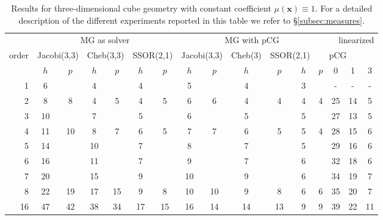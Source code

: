\documentclass[smallcondensed,final]{svjour3}     %
\newcommand{\bs}[1]{\ensuremath{\boldsymbol #1}}
\begin{document}
\begin{table}
  \caption{\label{tab:3d-box} Results for three-dimensional cube
    geometry with constant coefficient $\mu(\bs x) \equiv 1$. For a
    detailed description of the different experiments reported in this
    table we refer to \S\ref{subsec:measures}.}  \centering
	  \begin{tabular}{|r|c c|c c|c c||c c|c c|c c||c c c|} 
	    \hline
	    & \multicolumn{6}{c||}{MG as solver} & \multicolumn{6}{c||}{MG with pCG} & \multicolumn{3}{r|}{linearized} \\
	    \cline{2-13}
	    \!\!\! order \!\!\!\! &  \multicolumn{2}{c|}{\!\!\scriptsize  Jacobi(3,3)\!\!} &  \multicolumn{2}{c|}{\!\!\scriptsize Cheb(3,3)\!\!} & \multicolumn{2}{c||}{\!\!\scriptsize  SSOR(2,1)\!\!} & \multicolumn{2}{c|}{\!\!\scriptsize Jacobi(3,3)\!\!} &  \multicolumn{2,1}{c|}{\!\!\scriptsize Cheb(3)\!\!} & \multicolumn{2}{c||}{\!\!\scriptsize SSOR(2,1)\!\!} & \multicolumn{3}{c|}{pCG}\\
	\hline
	 & $h$ & $p$ & $h$ & $p$& $h$ & $p$& $h$ & $p$& $h$ & $p$& $h$ & $p$& 0 & 1 & 3\\
	 \cline{2-16}
1 & 6 & & 4 & & 4 & & 5 & & 4 & & 3 & & - & - & - \\
2 & 8 & 8 & 4 & 5 & 4 & 5 & 6 & 6 & 4 & 4 & 4 & 4 &  25 & 14 & 5 \\
3 & 10 & & 7 & & 5 & & 6 & & 5 & & 5 & & 27 & 13 & 5  \\
4 & 11 & 10 & 8 & 7 & 6 & 5 & 7 & 7 & 6 & 5 & 5 & 4 & 28 & 15 & 6 \\
5 & 14 & & 10 & & 7 & & 8 & & 7 & & 5 & & 29 & 16 & 6 \\
6 & 16 & & 11 & & 7 & & 9 & & 7 & & 6 & & 32 & 18 & 6 \\
7 & 20 & & 15 & & 9 & & 10 & & 9 & & 6 & & 34 & 19 & 7 \\
8 & 22 & 19 & 17 & 15 & 9 & 8 & 10 & 10 & 9 & 8 & 6 & 6 & 35 & 20 & 7 \\
16 & 47 & 42 & 38 & 34 & 17 & 15 & 16 & 14 & 14 & 13 & 9 & 9 & 39 & 22 & 11 \\
\hline 
 \end{tabular}
\end{table}
\end{document}
